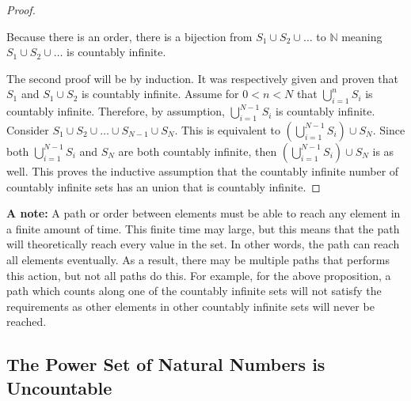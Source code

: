 \begin{proof}
\begin{figure}[H]
{
        }
        
    \end{figure}
    Because there is an order, there is a bijection from \(S_1\cup S_2\cup\dots\) to \(\mathbb{N}\) meaning \(S_1\cup S_2\cup\dots\) is countably infinite.

    The second proof will be by induction. It was respectively given and proven that \(S_1\) and \(S_1\cup S_2\) is countably infinite. Assume for \(0<n<N\) that
    \(\bigcup_{i=1}^{n}S_i\) is countably infinite. Therefore, by assumption, \(\bigcup_{i=1}^{N-1}S_i\) is countably infinite. Consider 
    \(S_1\cup S_2\cup\dots\cup S_{N-1}\cup S_{N}\). This is equivalent to \((\bigcup_{i=1}^{N-1}S_i)\cup S_N\). Since both \(\bigcup_{i=1}^{N-1}S_i\) and \(S_N\) are
    both countably infinite, then \((\bigcup_{i=1}^{N-1}S_i)\cup S_N\) is as well. This proves the inductive assumption that the countably infinite number of countably
    infinite sets has an union that is countably infinite.
\end{proof}

\bigskip
\textbf{A note:} A path or order between elements must be able to reach any element in a finite amount of time. This finite time may large, but this means that the path will
theoretically reach every value in the set. In other words, the path can reach all elements eventually. As a result, there may be multiple paths that performs this action,
but not all paths do this. For example, for the above proposition, a path which counts along one of the countably infinite sets will not satisfy the requirements as other
elements in other countably infinite sets will never be reached.

\subsection{The Power Set of Natural Numbers is Uncountable}

